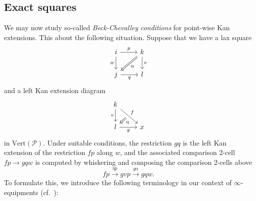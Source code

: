 \documentclass[a4paper, 11pt]{amsart}
\numberwithin{theorem}{section}
\theoremstyle{definition}
\renewcommand{\P}{\mathscr{P}}
\renewcommand{\Vert}{\mathrm{Vert}}
\begin{document}
\subsection{Exact squares}\label{ssection.exact-squares}
We may now study so-called \textit{Beck-Chevalley conditions} for point-wise Kan extensions. 
This about the following situation. Suppose that 
we have a lax square 
\[
	\begin{tikzcd}
		i \arrow[r, "p"]\arrow[d,"w"'] &|[alias=f]| k \arrow[d, "v"] \\ 
		|[alias=t]|j \arrow[r, "q"'] & l 
		\arrow[from=f,to=t, Rightarrow, "\alpha"]
	\end{tikzcd}
\]
 and a left Kan extension diagram
\[
	\begin{tikzcd}
		k \arrow[dr, "f"name=f]\arrow[d,"v"']   \\
		|[alias=t]|l \arrow[r, "g"'] & x
		\arrow[from=f, to=t, Rightarrow, shorten <= 6pt, "\eta"]
	\end{tikzcd}
\]
in $\Vert(\P)$.
Under suitable conditions, the restriction $gq$ is the left Kan extension 
of the restriction $fp$ along $w$, and the associated comparison 2-cell $fp \rightarrow gqw$ 
is computed by whiskering and composing the comparison 2-cells above
$$
	fp \xrightarrow{\eta p} gvp \xrightarrow{g\alpha} gqw.
$$
To formulate this, we introduce the following terminology in our context of $\infty$-equipments (cf.\ \cite[Definition 9.2.2]{RiehlVerity}):
\end{document}
